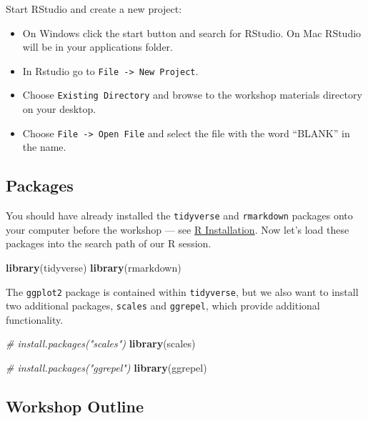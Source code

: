 \documentclass[]{book}
\newenvironment{Shaded}{\begin{snugshade}}{\end{snugshade}}
\newcommand{\CommentTok}[1]{\textcolor[rgb]{0.56,0.35,0.01}{\textit{#1}}}
\newcommand{\KeywordTok}[1]{\textcolor[rgb]{0.13,0.29,0.53}{\textbf{#1}}}
\newcommand{\NormalTok}[1]{#1}
\providecommand{\tightlist}{%
  \setlength{\itemsep}{0pt}\setlength{\parskip}{0pt}}
\begin{document}
Start RStudio and create a new project:

\begin{itemize}
\tightlist
\item
  On Windows click the start button and search for RStudio. On Mac
  RStudio will be in your applications folder.
\item
  In Rstudio go to \texttt{File\ -\textgreater{}\ New\ Project}.
\item
  Choose \texttt{Existing\ Directory} and browse to the workshop materials directory on your desktop.
\item
  Choose \texttt{File\ -\textgreater{}\ Open\ File} and select the file with the word ``BLANK'' in the name.
\end{itemize}

\hypertarget{packages-1}{%
\subsection{Packages}\label{packages-1}}

You should have already installed the \texttt{tidyverse} and \texttt{rmarkdown}
packages onto your computer before the workshop
--- see \href{./Rinstall.html}{R Installation}.
Now let's load these packages into the search path of our R session.

\begin{Shaded}
\begin{Highlighting}[]
\KeywordTok{library}\NormalTok{(tidyverse)}
\KeywordTok{library}\NormalTok{(rmarkdown)}
\end{Highlighting}
\end{Shaded}

The \texttt{ggplot2} package is contained within \texttt{tidyverse}, but we also want to
install two additional packages, \texttt{scales} and \texttt{ggrepel}, which provide
additional functionality.

\begin{Shaded}
\begin{Highlighting}[]
\CommentTok{# install.packages("scales")}
\KeywordTok{library}\NormalTok{(scales)}

\CommentTok{# install.packages("ggrepel") }
\KeywordTok{library}\NormalTok{(ggrepel)}
\end{Highlighting}
\end{Shaded}

\hypertarget{workshop-outline-1}{%
\subsection{Workshop Outline}\label{workshop-outline-1}}
\end{document}
